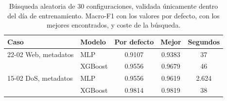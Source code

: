 \begin{table}[htbp]
  \centering
  \caption[Búsqueda de hiperparámetros]{Búsqueda aleatoria de 30 configuraciones, validada únicamente dentro del día de entrenamiento. Macro-F1 con los valores por defecto, con los mejores encontrados, y coste de la búsqueda.}
  \label{tab:anexo-hiperparametros}
  \begin{tabular}{llccc}
    \toprule
    \textbf{Caso} & \textbf{Modelo} & \textbf{Por defecto} & \textbf{Mejor} & \textbf{Segundos} \\
    \midrule
    22-02 Web, metadatos & MLP & 0.9107 & 0.9383 & 37 \\
     & XGBoost & 0.9556 & 0.9679 & 46 \\
    \midrule
    15-02 DoS, metadatos & MLP & 0.9556 & 0.9619 & 2.624 \\
     & XGBoost & 0.9814 & 0.9819 & 38 \\
    \bottomrule
  \end{tabular}
\end{table}

